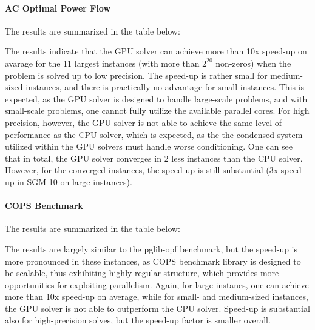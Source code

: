 \documentclass{article}
\begin{document}
\paragraph{AC Optimal Power Flow}
The results are summarized in the table below:
\begin{center}
  \footnotesize
  
\end{center}
The results indicate that the GPU solver can achieve more than 10x speed-up on avarage for the 11 largest instances (with more than $2^{20}$ non-zeros) when the problem is solved up to low precision. The speed-up is rather small for medium-sized instances, and there is practically no advantage for small instances. This is expected, as the GPU solver is designed to handle large-scale problems, and with small-scale problems, one cannot fully utilize the available parallel cores. For high precision, however, the GPU solver is not able to achieve the same level of performance as the CPU solver, which is expected, as the the condensed system utilized within the GPU solvers must handle worse conditioning. One can see that in total, the GPU solver converges in 2 less instances than the CPU solver. However, for the converged instances, the speed-up is still substantial (3x speed-up in SGM 10 on large instances).


\paragraph{COPS Benchmark}
The results are summarized in the table below:
\begin{center}
  \footnotesize
  
\end{center}
The results are largely similar to the pglib-opf benchmark, but the speed-up is more pronounced in these instances, as COPS benchmark library is designed to be scalable, thus exhibiting highly regular structure, which provides more opportunities for exploiting parallelism. Again, for large instanes, one can achieve more than 10x speed-up on average, while for small- and medium-sized instances, the GPU solver is not able to outperform the CPU solver. Speed-up is substantial also for high-precision solves, but the speed-up factor is smaller overall.

\end{document}

